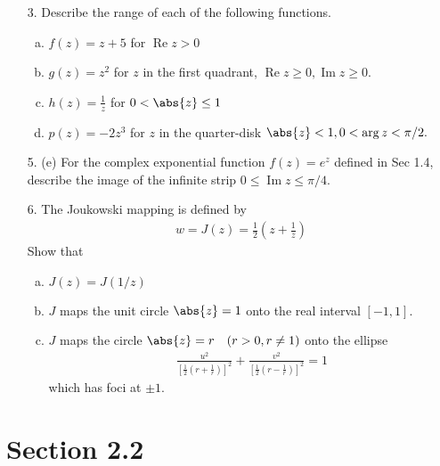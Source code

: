 \documentclass{article}
\DeclareMathOperator{\re}{Re}
\DeclareMathOperator{\im}{Im}
\begin{document}
\begin{itemize}
	\item[3.] Describe the range of each of the following functions.
		\begin{enumerate}[(a)]
			\item $f(z)=z+5$ for $\re z>0$

			\item $g(z)=z^2$ for $z$ in the first quadrant, $\re z\ge 0, \im z\ge 0.$

			\item $h(z)=\frac{1}{z}$ for $0<\abs{z}\le 1$

			\item $p(z)=-2z^3$ for $z$ in the quarter-disk $\abs{z}<1, 0<\arg z<\pi/2.$
				
		\end{enumerate}

	\item[5.] (e) For the complex exponential function $f(z)=e^z$ defined in Sec 1.4, describe the image of the infinite strip $0\le \im z\le \pi/4.$

	\item[6.] The Joukowski mapping is defined by
		\begin{align*}
			w=J(z) = \frac{1}{2}\left( z+\frac{1}{z} \right)
		\end{align*}
		Show that
		\begin{enumerate}[(a)]
			\item $J(z)=J(1/z)$

			\item $J$ maps the unit circle $\abs{z}=1$ onto the real interval $[-1, 1].$

			\item $J$ maps the circle $\abs{z}=r\quad (r>0, r\neq 1)$ onto the ellipse
				\begin{align*}
					\frac{u^2}{\left[ \frac{1}{2}\left( r+\frac{1}{r} \right) \right]^2} + \frac{v^2}{\left[ \frac{1}{2}\left( r-\frac{1}{r} \right) \right]^2} = 1
				\end{align*}
				which has foci at $\pm 1.$

		\end{enumerate}
		
\end{itemize}

\section*{Section 2.2}
\end{document}
